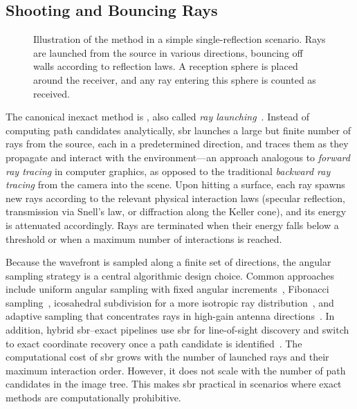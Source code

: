\subsection{Shooting and Bouncing Rays}

\begin{figure}
  \caption{Illustration of the  method in a simple single-reflection scenario. Rays are launched from the source in various directions, bouncing off walls according to reflection laws. A reception sphere is placed around the receiver, and any ray entering this sphere is counted as received.}
\end{figure}

The canonical inexact method is , also called \emph{ray launching}~. Instead of computing path candidates analytically, \gls{sbr} launches a large but finite number of rays from the source, each in a predetermined direction, and traces them as they propagate and interact with the environment---an approach analogous to \emph{forward ray tracing} in computer graphics, as opposed to the traditional \emph{backward ray tracing} from the camera into the scene. Upon hitting a surface, each ray spawns new rays according to the relevant physical interaction laws (specular reflection, transmission via Snell's law, or diffraction along the Keller cone), and its energy is attenuated accordingly. Rays are terminated when their energy falls below a threshold or when a maximum number of interactions is reached.

Because the wavefront is sampled along a finite set of directions, the angular sampling strategy is a central algorithmic design choice. Common approaches include uniform angular sampling with fixed angular increments~, Fibonacci sampling~, icosahedral subdivision for a more isotropic ray distribution~, and adaptive sampling that concentrates rays in high-gain antenna directions~. In addition, hybrid \gls{sbr}--exact pipelines use \gls{sbr} for \gls{line-of-sight} discovery and switch to exact coordinate recovery once a path candidate is identified~. The computational cost of \gls{sbr} grows with the number of launched rays and their maximum interaction order. However, it does not scale with the number of path candidates in the image tree. This makes \gls{sbr} practical in scenarios where exact methods are computationally prohibitive.

